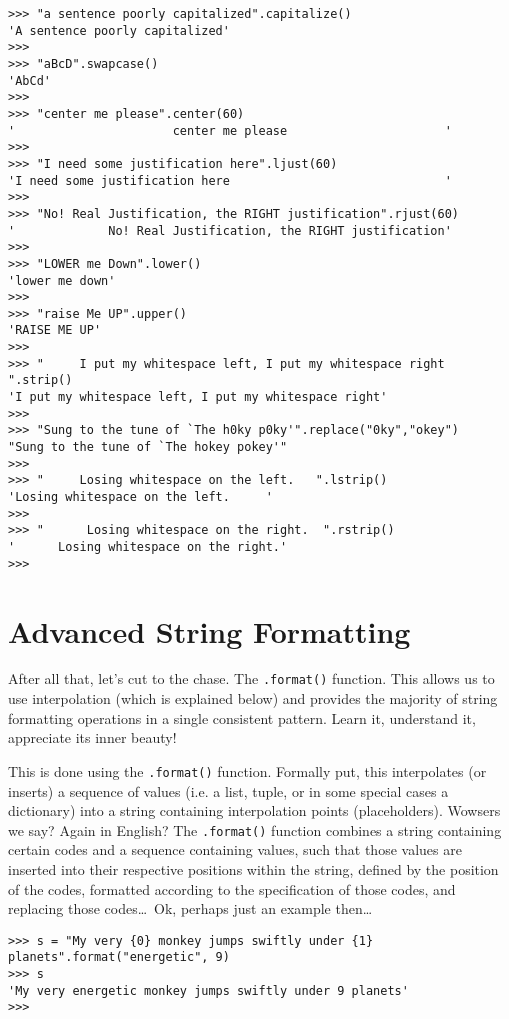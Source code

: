 \begin{lstlisting}
>>> "a sentence poorly capitalized".capitalize()
'A sentence poorly capitalized'
>>>
>>> "aBcD".swapcase()
'AbCd'
>>>
>>> "center me please".center(60)
'                      center me please                      '
>>>
>>> "I need some justification here".ljust(60)
'I need some justification here                              '
>>>
>>> "No! Real Justification, the RIGHT justification".rjust(60)
'             No! Real Justification, the RIGHT justification'
>>>
>>> "LOWER me Down".lower()
'lower me down'
>>>
>>> "raise Me UP".upper()
'RAISE ME UP'
>>>
>>> "     I put my whitespace left, I put my whitespace right     ".strip()
'I put my whitespace left, I put my whitespace right'
>>>
>>> "Sung to the tune of `The h0ky p0ky'".replace("0ky","okey")
"Sung to the tune of `The hokey pokey'"
>>>
>>> "     Losing whitespace on the left.   ".lstrip()
'Losing whitespace on the left.     '
>>>
>>> "      Losing whitespace on the right.  ".rstrip()
'      Losing whitespace on the right.' 
>>>
\end{lstlisting}

\section{Advanced String Formatting}

After all that, let's cut to the chase. The \texttt{.format()} function.   This allows us to use interpolation (which is explained below) and provides the majority of string   formatting operations in a single consistent pattern.  Learn it,   understand it, appreciate its inner beauty!

This is done using the \texttt{.format()} function. Formally put, this interpolates (or inserts) a sequence of   values (i.e. a list, tuple, or in some special cases a dictionary) into   a string containing interpolation points (placeholders). Wowsers we   say? Again in English? The \texttt{.format()} function combines a string   containing certain codes and a sequence containing values, such that   those values are inserted into their respective positions within the   string, defined by the position of the codes, formatted according to   the specification of those codes, and replacing those codes\ldots\ Ok, perhaps just an example   then\ldots
\begin{lstlisting}
>>> s = "My very {0} monkey jumps swiftly under {1} planets".format("energetic", 9)
>>> s
'My very energetic monkey jumps swiftly under 9 planets'
>>>
\end{lstlisting}


